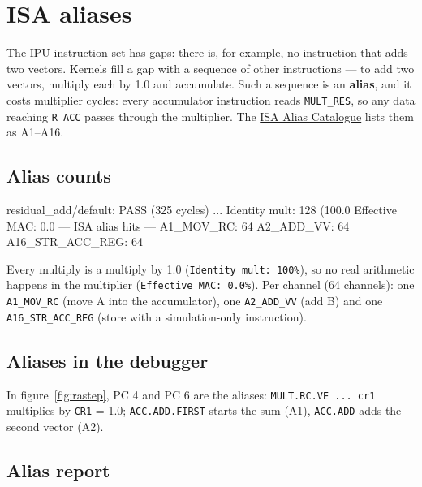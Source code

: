 \documentclass[11pt,a4paper]{article}
\newcommand{\doc}[2]{\href{https://rechefe.github.io/ipu-emulator/#1/}{\textcolor{accent}{#2}}}
\begin{document}
\section{ISA aliases}\label{sec:aliases}

The IPU instruction set has gaps: there is, for example, no instruction that
adds two vectors. Kernels fill a gap with a sequence of other instructions ---
to add two vectors, multiply each by 1.0 and accumulate. Such a sequence is an
\textbf{alias}, and it costs multiplier cycles: every accumulator instruction
reads \texttt{MULT\_RES}, so any data reaching \texttt{R\_ACC} passes through
the multiplier. The \doc{isa-alias-catalogue}{ISA Alias Catalogue} lists them
as A1--A16.

\subsection{Alias counts}

\begin{termout}
residual_add/default: PASS (325 cycles)
...
Identity mult:            128  (100.0%
Effective MAC:           0.0%
--- ISA alias hits ---
A1_MOV_RC:                 64
A2_ADD_VV:                 64
A16_STR_ACC_REG:           64
\end{termout}

Every multiply is a multiply by 1.0 (\texttt{Identity mult: 100\%}), so no
real arithmetic happens in the multiplier (\texttt{Effective MAC: 0.0\%}).
Per channel (64 channels): one \texttt{A1\_MOV\_RC} (move A into the
accumulator), one \texttt{A2\_ADD\_VV} (add B) and one
\texttt{A16\_STR\_ACC\_REG} (store with a simulation-only instruction).

\subsection{Aliases in the debugger}

In figure~\ref{fig:rastep}, PC 4 and PC 6 are the aliases:
\texttt{MULT.RC.VE ... cr1} multiplies by \texttt{CR1} = 1.0;
\texttt{ACC.ADD.FIRST} starts the sum (A1), \texttt{ACC.ADD} adds the second
vector (A2).

\needspace{6cm}
\subsection{Alias report}
\end{document}
